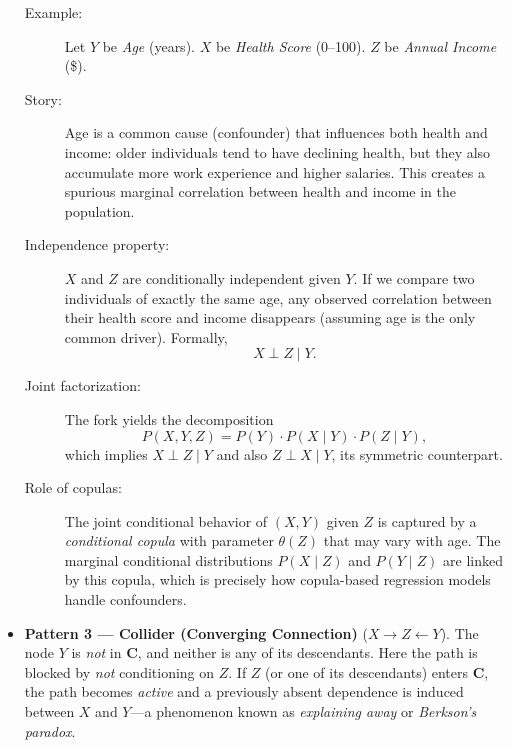 \begin{itemize}
\begin{description}
\item[Example:] Let \(Y\) be \emph{Age} (years). \(X\) be \emph{Health Score} (0--100). \(Z\) be \emph{Annual Income} (\$).
\item[Story:] Age is a common cause (confounder) that influences both health and income: older individuals tend to have declining health, but they also accumulate more work experience and higher salaries. This creates a spurious marginal correlation between health and income in the population.
\item[Independence property:] \(X\) and \(Z\) are conditionally independent given \(Y\). If we compare two individuals of exactly the same age, any observed correlation between their health score and income disappears (assuming age is the only common driver). Formally,
\[
X \perp Z \mid Y.
\]
\item[Joint factorization:] The fork yields the decomposition
\[
P(X,Y,Z) = P(Y) \cdot P(X \mid Y) \cdot P(Z \mid Y),
\]
which implies $X \perp Z \mid Y$ and also $Z \perp X \mid Y$, its symmetric counterpart.
\item[Role of copulas:] The joint conditional behavior of \((X,Y)\) given \(Z\) is captured by a \emph{conditional copula} with parameter \(\theta(Z)\) that may vary with age. The marginal conditional distributions \(P(X \mid Z)\) and \(P(Y \mid Z)\) are linked by this copula, which is precisely how copula-based regression models handle confounders.
\end{description}

\item \textbf{Pattern 3 — Collider (Converging Connection)} ($X \to Z \leftarrow Y$).
The node $Y$ is \emph{not} in $\mathbf{C}$, and neither is any of its
descendants. Here the path is blocked by \emph{not} conditioning on $Z$. If
$Z$ (or one of its descendants) enters $\mathbf{C}$, the path becomes
\emph{active} and a previously absent dependence is induced between $X$ and
$Y$---a phenomenon known as \emph{explaining away} or \emph{Berkson's paradox}.


\end{itemize}
